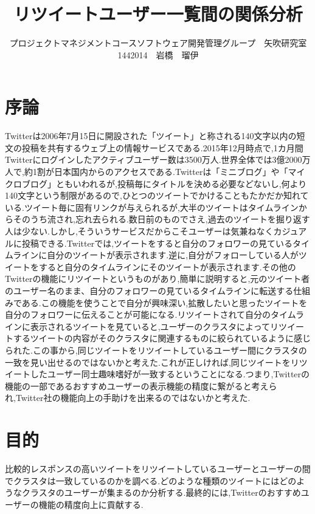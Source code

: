 \documentclass[uplatex,twocolumn,dvipdfmx]{jsarticle}
\title{\vspace{-5mm}\fontsize{14pt}{0pt}\selectfont リツイートユーザー一覧間の関係分析}
\author{\normalsize プロジェクトマネジメントコースソフトウェア開発管理グループ　矢吹研究室　1442014　岩橋　瑠伊}
\date{}
\begin{document}
\fontsize{10.5pt}{\baselineskip}\selectfont
\maketitle





\section{序論}
Twitterは2006年7月15日に開設された「ツイート」と称される140文字以内の短文の投稿を共有するウェブ上の情報サービスである.2015年12月時点で,1カ月間Twitterにログインしたアクティブユーザー数は3500万人.世界全体では3億2000万人で,約1割が日本国内からのアクセスである.\cite{twitter}Twitterは「ミニブログ」や「マイクロブログ」ともいわれるが,投稿毎にタイトルを決める必要などないし,何より140文字という制限があるので,ひとつのツイートでかけることもたかだか知れている.ツイート毎に固有リンクが与えられるが,大半のツイートはタイムラインからそのうち流され,忘れ去られる.数日前のものでさえ,過去のツイートを掘り返す人は少ない.しかし,そういうサービスだからこそユーザーは気兼ねなくカジュアルに投稿できる.\cite{kondou2015}Twitterでは,ツイートをすると自分のフォロワーの見ているタイムラインに自分のツイートが表示されます.逆に,自分がフォローしている人がツイートをすると自分のタイムラインにそのツイートが表示されます.その他のTwitterの機能にリツイートというものがあり,簡単に説明すると,元のツイート者のユーザー名のまま、自分のフォロワーの見ているタイムラインに転送する仕組みである.この機能を使うことで自分が興味深い,拡散したいと思ったツイートを自分のフォロワーに伝えることが可能になる.リツイートされて自分のタイムラインに表示されるツイートを見ていると,ユーザーのクラスタによってリツイートするツイートの内容がそのクラスタに関連するものに絞られているように感じられた.この事から,同じツイートをリツイートしているユーザー間にクラスタの一致を見い出せるのではないかと考えた.これが正しければ,同じツイートをリツイートしたユーザー同士趣味嗜好が一致するということになる.つまり,Twitterの機能の一部であるおすすめユーザーの表示機能の精度に繋がると考えられ,Twitter社の機能向上の手助けを出来るのではないかと考えた.


\section{目的}
比較的レスポンスの高いツイートをリツイートしているユーザーとユーザーの間でクラスタは一致しているのかを調べる.どのような種類のツイートにはどのようなクラスタのユーザーが集まるのか分析する.最終的には,Twitterのおすすめユーザーの機能の精度向上に貢献する.
\end{document}

